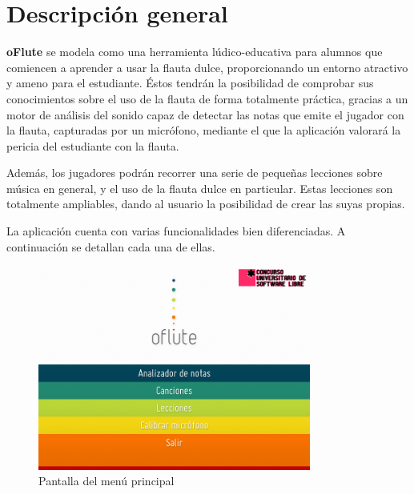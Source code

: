 \documentclass[a4paper,11pt]{article}
\begin{document}
\section{Descripción general}
\textbf{oFlute} se modela como una herramienta lúdico-educativa para alumnos que
comiencen a aprender a usar la flauta dulce, proporcionando un entorno atractivo
y ameno para el estudiante. Éstos tendrán la posibilidad de comprobar sus
conocimientos sobre el uso de la flauta de forma totalmente práctica, gracias a
un motor de análisis del sonido capaz de detectar las notas que emite el jugador
con la flauta, capturadas por un micrófono, mediante el que la aplicación
valorará la pericia del estudiante con la flauta.

Además, los jugadores podrán recorrer una serie de pequeñas lecciones sobre
música en general, y el uso de la flauta dulce en particular. Estas lecciones
son totalmente ampliables, dando al usuario la posibilidad de crear las suyas
propias.

La aplicación cuenta con varias funcionalidades bien diferenciadas. A
continuación se detallan cada una de ellas.

\begin{figure}[htp!]
  \vspace{1cm}
  \centering
  \includegraphics[width=0.8\textwidth]{imagen_menuPrincipal}
  \caption{Pantalla del menú principal}
\end{figure}

\pagebreak
\end{document}
